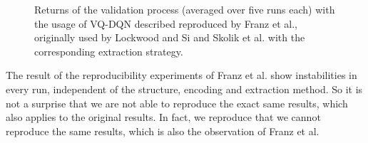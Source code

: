 \begin{figure*}[tb]
\centering
	\scalebox{.65}{}
	\caption{Returns of the validation process (averaged over five runs each)  with the usage of \ac{VQ-DQN} described reproduced by Franz et al.\autocite{instabilities}, originally used by Lockwood and Si\autocite{lockwood} and Skolik et al.\autocite{skolik} with the corresponding extraction strategy.}
\label{results}
\end{figure*}

The result of the reproducibility experiments of Franz et al. show instabilities in every run, independent of the structure, encoding and extraction method. 
So it is not a surprise that we are not able to reproduce the exact same results, which also applies to the original results.
In fact, we reproduce that we cannot reproduce the same results, which is also the observation of Franz et al. 
